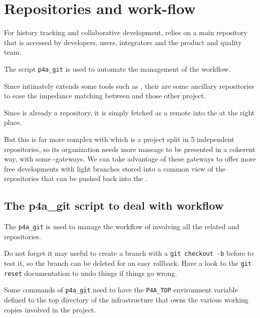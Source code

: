 \documentclass[a4paper]{article}
\begin{document}
\section{Repositories and work-flow}
\label{sec:repos-workfl}

For history tracking and collaborative development, \Apfa relies on a main
\Agit repository that is accessed by \Apfa developers, users, integrators
and the product and quality team.

The script \verb|p4a_git| is used to automate the management of the
workflow.

Since \Apfa intimately extends some tools such as \Apips, their are some
ancillary repositories to ease the impedance matching between \Apfa and
those other project.

Since \Apolylib is already a \Agit repository, it is simply fetched as a
remote \Agit into the \Apfa at the right place.

But this is far more complex with \Apips which is a project split in 5
independent \Asvn repositories, so its organization needs more massage to
be presented in a coherent way, with some \Asvn-\Agit gateways. We can
take advantage of these gateways to offer more free developments with
light branches stored into a common \Agit view of the \Apips{} \Asvn
repositories that can be pushed back into the \Apips{} \Asvn .


\subsection{The p4a\_git script to deal with workflow}
\label{sec:p4a_git-script-deal}

The \verb|p4a_git| is used to manage the workflow of \Apfa involving all
the related \Agit and \Asvn repositories.

Do not forget it may useful to create a branch with a \texttt{git checkout
  -b} before to test it, so the branch can be deleted for an easy
rollback. Have a look to the \texttt{git reset} documentation to undo
things if things go wrong.

Some commands of \verb|p4a_git| need to have the \verb|P4A_TOP|
environment variable defined to the top directory of the \Apfa
infrastructure that owns the various \Agit working copies involved in the
project.
\end{document}
